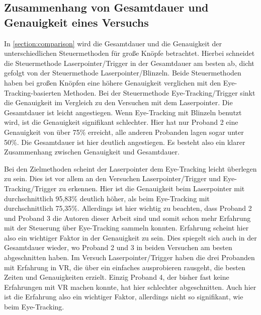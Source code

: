 \subsection{Zusammenhang von Gesamtdauer und Genauigkeit eines Versuchs}
In \autoref{section:comparison} wird die Gesamtdauer und die Genauigkeit der unterschiedlichen Steuermethoden für große Knöpfe betrachtet. Hierbei schneidet die Steuermethode Laserpointer/Trigger in der Gesamtdauer am besten ab, dicht gefolgt von der Steuermethode Laserpointer/Blinzeln. Beide Steuermethoden haben bei großen Knöpfen eine höhere Genauigkeit verglichen mit den Eye-Tracking-basierten Methoden. Bei der Steuermethode Eye-Tracking/Trigger sinkt die Genauigkeit im Vergleich zu den Versuchen mit dem Laserpointer. Die Gesamtdauer ist leicht angestiegen. Wenn Eye-Tracking mit Blinzeln benutzt wird, ist die Genauigkeit signifikant schlechter. Hier hat nur Proband 2 eine Genauigkeit von über 75\% erreicht, alle anderen Probanden lagen sogar unter 50\%. Die Gesamtdauer ist hier deutlich angestiegen. Es besteht also ein klarer Zusammenhang zwischen Genauigkeit und Gesamtdauer. 

Bei den Zielmethoden scheint der Laserpointer dem Eye-Tracking leicht überlegen zu sein. Dies ist vor allem an den Versuchen Laserpointer/Trigger und Eye-Tracking/Trigger zu erkennen. Hier ist die Genauigkeit beim Laserpointer mit durchschnittlich 95,83\% deutlich höher, als beim Eye-Tracking mit durchschnittlich 75,35\%. Allerdings ist hier wichtig zu beachten, dass Proband 2 und Proband 3 die Autoren dieser Arbeit sind und somit schon mehr Erfahrung mit der Steuerung über Eye-Tracking sammeln konnten. Erfahrung scheint hier also ein wichtiger Faktor in der Genauigkeit zu sein. Dies spiegelt sich auch in der Gesamtdauer wieder, wo Proband 2 und 3 in beiden Versuchen am besten abgeschnitten haben. Im Versuch Laserpointer/Trigger haben die drei Probanden mit Erfahrung in VR, die über ein einfaches ausprobieren rausgeht, die besten Zeiten und Genauigkeiten erzielt. Einzig Proband 4, der bisher fast keine Erfahrungen mit VR machen konnte, hat hier schlechter abgeschnitten. Auch hier ist die Erfahrung also ein wichtiger Faktor, allerdings nicht so signifikant, wie beim Eye-Tracking. 

